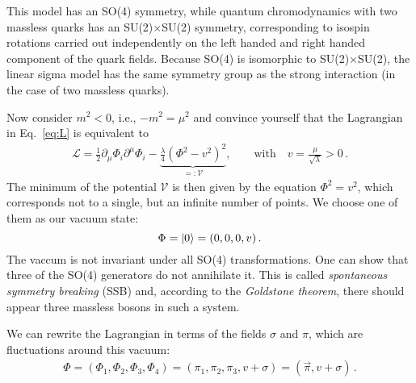 \documentclass[11pt]{latex/exercise}
\begin{document}
This model has an SO(4) symmetry, while quantum chromodynamics with two massless quarks has an SU(2)$\times$SU(2) symmetry, corresponding to isospin rotations carried out independently on the left handed and right handed component of the quark fields. Because SO(4) is isomorphic to SU(2)$\times$SU(2), the linear sigma model has the same symmetry group as the strong interaction (in the case of two massless quarks).


Now consider $m^2<0$, i.e., $-m^2=\mu^2$ and convince yourself that the Lagrangian in Eq.~\eqref{eq:L} is equivalent to
\begin{eqnarray}
    \mathcal{L} = \frac12 \partial_{\mu} \Phi_i \partial^{\mu} \Phi_i
    - \underbrace{\frac{\lambda}{4} {\left( \Phi^2 - v^2 \right)}^2}_{\displaystyle =: \mathcal V},
    \qquad \text{with} \quad v=\frac{\mu}{\sqrt{\lambda}}>0 \,.
    \label{eq:Lwithv}
\end{eqnarray}
The minimum of the potential $\mathcal V$ is then given by the equation $\Phi^2 = v^2$,
which corresponds not to a single, but an infinite number of points.
We choose one of them as our vacuum state:
\begin{equation}
    \Phi
    =\ket{0}
    = (0,0,0,v)\,.
    \label{eq:vacuum}
\end{equation}
The vaccum is not invariant under all SO(4) transformations. One can show that three of the SO(4) generators do not annihilate it. This is called \emph{spontaneous symmetry breaking} (SSB) and, according to the \emph{Goldstone theorem}, there should appear three massless bosons in such a system.

We can rewrite the Lagrangian in terms of the fields $\sigma$ and $\pi$, which are fluctuations around this vacuum:
\begin{eqnarray}
    \Phi = (\Phi_1, \Phi_2, \Phi_3, \Phi_4)
    = (\pi_1, \pi_2, \pi_3,v + \sigma) = (\vec{\pi}, v+\sigma)\,.
\end{eqnarray}
\end{document}
